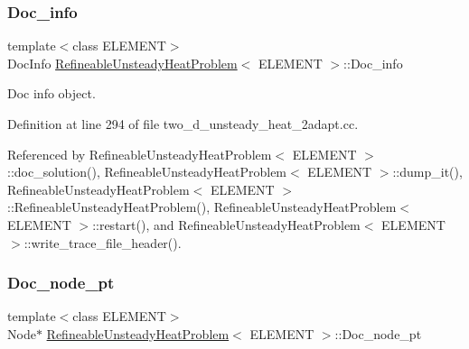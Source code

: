 \mbox{\label{classRefineableUnsteadyHeatProblem_a9ea9d79a57cb16a6292a637965767f7e}} 
\subsubsection{\texorpdfstring{Doc\+\_\+info}{Doc\_info}}
{\footnotesize\ttfamily template$<$class E\+L\+E\+M\+E\+NT$>$ \\
Doc\+Info \hyperlink{classRefineableUnsteadyHeatProblem}{Refineable\+Unsteady\+Heat\+Problem}$<$ E\+L\+E\+M\+E\+NT $>$\+::Doc\+\_\+info\hspace{0.3cm}{\ttfamily [private]}}



Doc info object. 



Definition at line 294 of file two\+\_\+d\+\_\+unsteady\+\_\+heat\+\_\+2adapt.\+cc.



Referenced by Refineable\+Unsteady\+Heat\+Problem$<$ E\+L\+E\+M\+E\+N\+T $>$\+::doc\+\_\+solution(), Refineable\+Unsteady\+Heat\+Problem$<$ E\+L\+E\+M\+E\+N\+T $>$\+::dump\+\_\+it(), Refineable\+Unsteady\+Heat\+Problem$<$ E\+L\+E\+M\+E\+N\+T $>$\+::\+Refineable\+Unsteady\+Heat\+Problem(), Refineable\+Unsteady\+Heat\+Problem$<$ E\+L\+E\+M\+E\+N\+T $>$\+::restart(), and Refineable\+Unsteady\+Heat\+Problem$<$ E\+L\+E\+M\+E\+N\+T $>$\+::write\+\_\+trace\+\_\+file\+\_\+header().

\mbox{\label{classRefineableUnsteadyHeatProblem_a7ff1982af5819bab492c693178be0c24}} 
\subsubsection{\texorpdfstring{Doc\+\_\+node\+\_\+pt}{Doc\_node\_pt}}
{\footnotesize\ttfamily template$<$class E\+L\+E\+M\+E\+NT$>$ \\
Node$\ast$ \hyperlink{classRefineableUnsteadyHeatProblem}{Refineable\+Unsteady\+Heat\+Problem}$<$ E\+L\+E\+M\+E\+NT $>$\+::Doc\+\_\+node\+\_\+pt\hspace{0.3cm}{\ttfamily [private]}}



